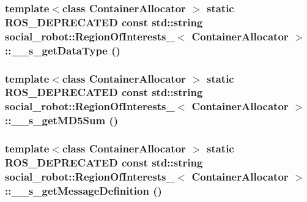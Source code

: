 \label{structsocial__robot_1_1RegionOfInterests___ae30b59434e53419e80a04f26d51c28ca}
\hypertarget{structsocial__robot_1_1RegionOfInterests___a2bf98d6bff2a0639be818a1152f7fb0c}{
\subsubsection[{\_\-\_\-s\_\-getDataType}]{\setlength{\rightskip}{0pt plus 5cm}template$<$class ContainerAllocator $>$ static ROS\_\-DEPRECATED const std::string {\bf social\_\-robot::RegionOfInterests\_\-}$<$ ContainerAllocator $>$::\_\-\_\-s\_\-getDataType ()}}
\label{structsocial__robot_1_1RegionOfInterests___a2bf98d6bff2a0639be818a1152f7fb0c}
\hypertarget{structsocial__robot_1_1RegionOfInterests___a88f97dd9f5406ecc4a72ea3d2e5db996}{
\subsubsection[{\_\-\_\-s\_\-getMD5Sum}]{\setlength{\rightskip}{0pt plus 5cm}template$<$class ContainerAllocator $>$ static ROS\_\-DEPRECATED const std::string {\bf social\_\-robot::RegionOfInterests\_\-}$<$ ContainerAllocator $>$::\_\-\_\-s\_\-getMD5Sum ()}}
\label{structsocial__robot_1_1RegionOfInterests___a88f97dd9f5406ecc4a72ea3d2e5db996}
\hypertarget{structsocial__robot_1_1RegionOfInterests___a9d788090d90f2322c9b7654e319bfe40}{
\subsubsection[{\_\-\_\-s\_\-getMessageDefinition}]{\setlength{\rightskip}{0pt plus 5cm}template$<$class ContainerAllocator $>$ static ROS\_\-DEPRECATED const std::string {\bf social\_\-robot::RegionOfInterests\_\-}$<$ ContainerAllocator $>$::\_\-\_\-s\_\-getMessageDefinition ()}}
